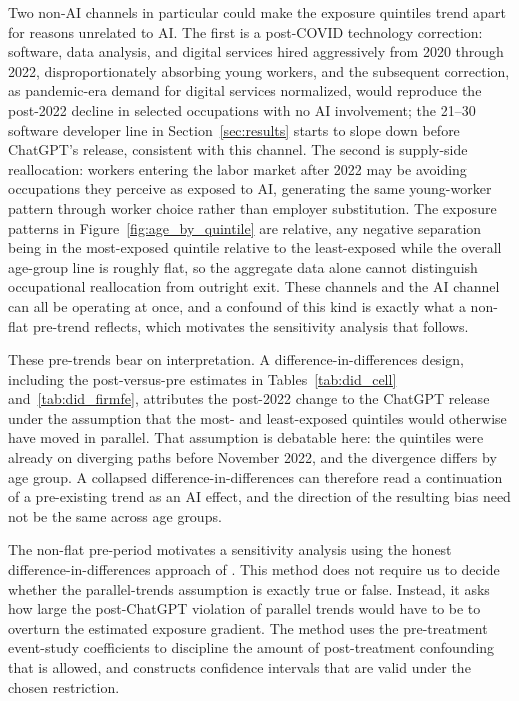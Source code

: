 \documentclass[12pt]{article}
\begin{document}
Two non-AI channels in particular could make the exposure quintiles trend apart for reasons unrelated to AI. The first is a post-COVID technology correction: software, data analysis, and digital services hired aggressively from 2020 through 2022, disproportionately absorbing young workers, and the subsequent correction, as pandemic-era demand for digital services normalized, would reproduce the post-2022 decline in selected occupations with no AI involvement; the 21--30 software developer line in Section~\ref{sec:results} starts to slope down before ChatGPT's release, consistent with this channel. The second is supply-side reallocation: workers entering the labor market after 2022 may be avoiding occupations they perceive as exposed to AI, generating the same young-worker pattern through worker choice rather than employer substitution. The exposure patterns in Figure~\ref{fig:age_by_quintile} are relative, any negative separation being in the most-exposed quintile relative to the least-exposed while the overall age-group line is roughly flat, so the aggregate data alone cannot distinguish occupational reallocation from outright exit. These channels and the AI channel can all be operating at once, and a confound of this kind is exactly what a non-flat pre-trend reflects, which motivates the sensitivity analysis that follows.

These pre-trends bear on interpretation. A difference-in-differences design, including the post-versus-pre estimates in Tables~\ref{tab:did_cell} and~\ref{tab:did_firmfe}, attributes the post-2022 change to the ChatGPT release under the assumption that the most- and least-exposed quintiles would otherwise have moved in parallel. That assumption is debatable here: the quintiles were already on diverging paths before November 2022, and the divergence differs by age group. A collapsed difference-in-differences can therefore read a continuation of a pre-existing trend as an AI effect, and the direction of the resulting bias need not be the same across age groups.

The non-flat pre-period motivates a sensitivity analysis using the honest difference-in-differences approach of \citet{rambachan2023}. This method does not require us to decide whether the parallel-trends assumption is exactly true or false. Instead, it asks how large the post-ChatGPT violation of parallel trends would have to be to overturn the estimated exposure gradient. The method uses the pre-treatment event-study coefficients to discipline the amount of post-treatment confounding that is allowed, and constructs confidence intervals that are valid under the chosen restriction.
\end{document}
